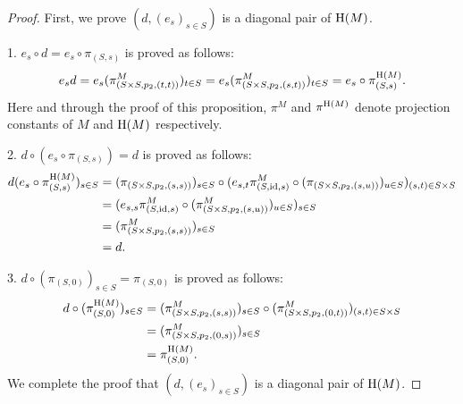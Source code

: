 \documentclass[a4paper,10pt]{article}
\theoremstyle{definition}
\DeclareMathOperator{\id}{id}
\newcommand\mc{\mathclose}
\begin{document}
\begin{proof}
First, we prove $(d,(e_s)_{s\in S})$ is a diagonal pair of ${\rm H}(M)$.

1. $e_s\circ d=e_s\circ \pi_{(S,s)}$ is proved as follows:
\[
e_sd
= e_s(\pi_{(S\times S,p_2,(t,t))}^M)_{t\in S}%
=e_s(\pi_{(S\times S,p_2,(s,t))}^M)_{t\in S}%
= e_s\circ \pi_{(S,s)}^{{\rm H}(M)}.
\]
Here and through the proof of this proposition,
$\pi^M$ and $\pi^{{\rm H}(M)}$ denote projection constants
of $M$ and ${\rm H}(M)$ respectively.

2. $d\circ(e_s\circ\pi_{(S,s)})=d$ is proved as follows:
\begin{align*}
d(e_s\circ \pi_{(S,s)}^{{\rm H}(M)})_{s\in S}
&= (\pi_{(S\times S,p_2,(s,s))})_{s\in S}
  \circ (e_{s,t}\pi_{(S,\id,s)}^M\circ
       (\pi_{(S\times S,p_2,(s,u))})_{u\in S})_{(s,t)\in S\times S}\\
&=(e_{s,s}\pi_{(S,\id,s)}^M\circ (\pi_{(S\times S,p_2,(s,u))}^M)_{u\in S})_{s\in S} \\
&=(\pi_{(S\times S,p_2,(s,s))}^M)_{s\in S}\\
&=d.
\end{align*}

3. $d\circ(\pi_{(S,0)})_{s\in S}=\pi_{(S,0)}$ is proved as follows:
\begin{align*}
d\circ (\pi_{(S,0)}^{{\rm H}(M)})_{s\in S}
&=(\pi_{(S\times S,p_2,(s,s))}^M)_{s\in S}
  \circ (\pi_{(S\times S,p_2,(0,t))}^M)_{(s,t)\in S\times S}\\
&=(\pi_{(S\times S,p_2,(0,s))}^M)_{s\in S}\\
&=\pi_{(S,0)}^{{\rm H}(M)}.
\end{align*}
We complete the proof that $(d,(e_s)_{s\in S})$ is a diagonal pair of ${\rm H}(M)$.


\end{proof}
\end{document}
